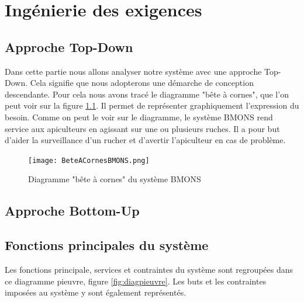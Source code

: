 \chapter{Ingénierie des exigences}
\section{Approche Top-Down}

Dans cette partie nous allons analyser notre système avec une approche Top-Down. Cela signifie que nous adopterons une démarche de conception descendante. Pour cela nous avons tracé le diagramme "bête à cornes", que l'on peut voir sur la figure \ref{fig:beteacorne}. Il permet de représenter graphiquement l'expression du besoin. Comme on peut le voir sur le diagramme, le système BMONS rend service aux apiculteurs en agissant sur une ou plusieurs ruches. Il a pour but d'aider la surveillance d'un rucher et d'avertir l'apiculteur en cas de problème.

\clearpage

\begin{figure}[h!]
\centering\texttt{[image: BeteACornesBMONS.png]}
\caption{\label{fig:beteacorne} Diagramme "bête à cornes" du système BMONS}
\end{figure}


\section{Approche Bottom-Up}

\section{Fonctions principales du système}

Les fonctions principale, services et contraintes du système sont regroupées dans ce diagramme pieuvre, figure \ref{fig:diagpieuvre}. Les buts et les contraintes imposées au système y sont également représentés. 
 
